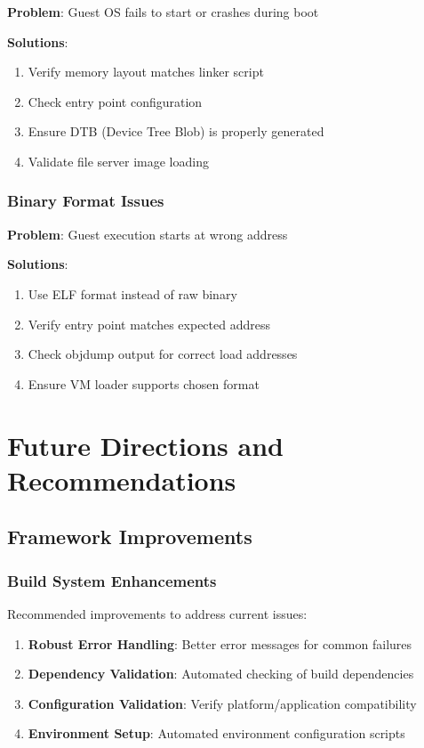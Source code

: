 \documentclass[11pt,a4paper]{article}
\begin{document}
\textbf{Problem}: Guest OS fails to start or crashes during boot

\textbf{Solutions}:
\begin{enumerate}
\item Verify memory layout matches linker script
\item Check entry point configuration
\item Ensure DTB (Device Tree Blob) is properly generated
\item Validate file server image loading
\end{enumerate}

\subsubsection{Binary Format Issues}

\textbf{Problem}: Guest execution starts at wrong address

\textbf{Solutions}:
\begin{enumerate}
\item Use ELF format instead of raw binary
\item Verify entry point matches expected address
\item Check objdump output for correct load addresses
\item Ensure VM loader supports chosen format
\end{enumerate}

\section{Future Directions and Recommendations}

\subsection{Framework Improvements}

\subsubsection{Build System Enhancements}

Recommended improvements to address current issues:

\begin{enumerate}
\item \textbf{Robust Error Handling}: Better error messages for common failures
\item \textbf{Dependency Validation}: Automated checking of build dependencies
\item \textbf{Configuration Validation}: Verify platform/application compatibility
\item \textbf{Environment Setup}: Automated environment configuration scripts
\end{enumerate}
\end{document}

